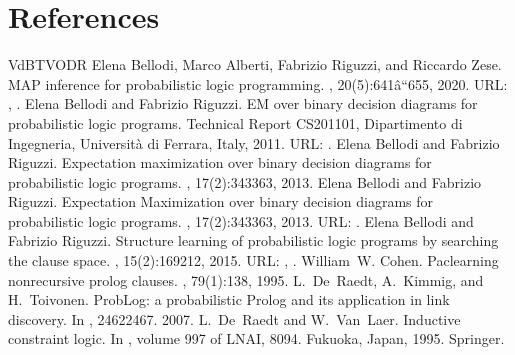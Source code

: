\documentclass[letterpaper,10pt,english]{sphinxmanual}
\begin{document}
\chapter{References}
\label{\detokenize{index:references}}
\begin{sphinxthebibliography}{VdBTVODR}
\sphinxAtStartPar
Elena Bellodi, Marco Alberti, Fabrizio Riguzzi, and Riccardo Zese. MAP inference for probabilistic logic programming. , 20(5):641â\texteuro{}“655, 2020. URL: , .
\sphinxAtStartPar
Elena Bellodi and Fabrizio Riguzzi. EM over binary decision diagrams for probabilistic logic programs. Technical Report CS\sphinxhyphen{}2011\sphinxhyphen{}01, Dipartimento di Ingegneria, Università di Ferrara, Italy, 2011. URL: .
\sphinxAtStartPar
Elena Bellodi and Fabrizio Riguzzi. Expectation maximization over binary decision diagrams for probabilistic logic programs. , 17(2):343\textendash{}363, 2013.
\sphinxAtStartPar
Elena Bellodi and Fabrizio Riguzzi. Expectation Maximization over binary decision diagrams for probabilistic logic programs. , 17(2):343\textendash{}363, 2013. URL: .
\sphinxAtStartPar
Elena Bellodi and Fabrizio Riguzzi. Structure learning of probabilistic logic programs by searching the clause space. , 15(2):169\textendash{}212, 2015. URL: , .
\sphinxAtStartPar
William W. Cohen. Pac\sphinxhyphen{}learning non\sphinxhyphen{}recursive prolog clauses. , 79(1):1\textendash{}38, 1995.
\sphinxAtStartPar
L. De Raedt, A. Kimmig, and H. Toivonen. ProbLog: a probabilistic Prolog and its application in link discovery. In , 2462\textendash{}2467. 2007.
\sphinxAtStartPar
L. De Raedt and W. Van Laer. Inductive constraint logic. In , volume 997 of LNAI, 80\textendash{}94. Fukuoka, Japan, 1995. Springer.

\end{sphinxthebibliography}
\end{document}
